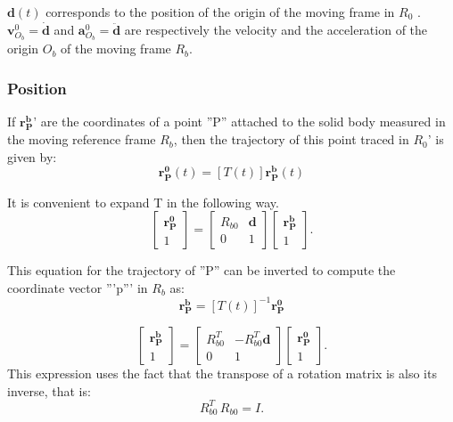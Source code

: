 \documentclass{article}
\begin{document}
$ \textbf{d}(t)$ corresponds to {\color{blue} the  position of the origin of the moving frame in $R_0$ }. $\mathbf{v}^0_{O_b}=\dot{\textbf{d}}$ and $\mathbf{a}^0_{O_b} = \ddot{\textbf{d}}$ are respectively the velocity and the acceleration of  the origin $O_b$ of the moving frame  $R_b$.



\subsubsection{Position}
If  $\mathbf{r^b_P}$' are the coordinates of a point ''P'' attached to the solid body measured in the moving reference frame $R_b$, then the trajectory of this point traced in $R_0$' is given by:
\begin{equation} \mathbf{r^0_P}(t)=[T(t)]\mathbf{r^b_P}(t)
\end{equation}

It is convenient to expand T in the following way.
\begin{equation}
\begin{bmatrix} \mathbf{r^0_P} \\ 1\end{bmatrix}=\begin{bmatrix}  R_{b0} & \textbf{d} \\ 0 & 1\end{bmatrix}
\begin{bmatrix} \mathbf{r^b_P} \\ 1\end{bmatrix}.\end{equation}


This equation for the trajectory of ''P'' can be inverted to compute the coordinate vector '''p''' in  $R_b$ as:
\begin{equation} \mathbf{r^b_P} = [T(t)]^{-1}\mathbf{r^0_P} \end{equation}

\begin{equation} 
\begin{bmatrix} \mathbf{r^b_P} \\ 1\end{bmatrix}=\begin{bmatrix} R_{b0}^T & -R_{b0}^T\textbf{d} \\ 0 & 1\end{bmatrix}
\begin{bmatrix} \mathbf{r^0_P} \\ 1\end{bmatrix}.\end{equation}
This expression uses the fact that the transpose of a rotation matrix is also its inverse, that is:
\begin{equation} R_{b0}^T \,R_{b0}=I.\!\end{equation}
\end{document}
